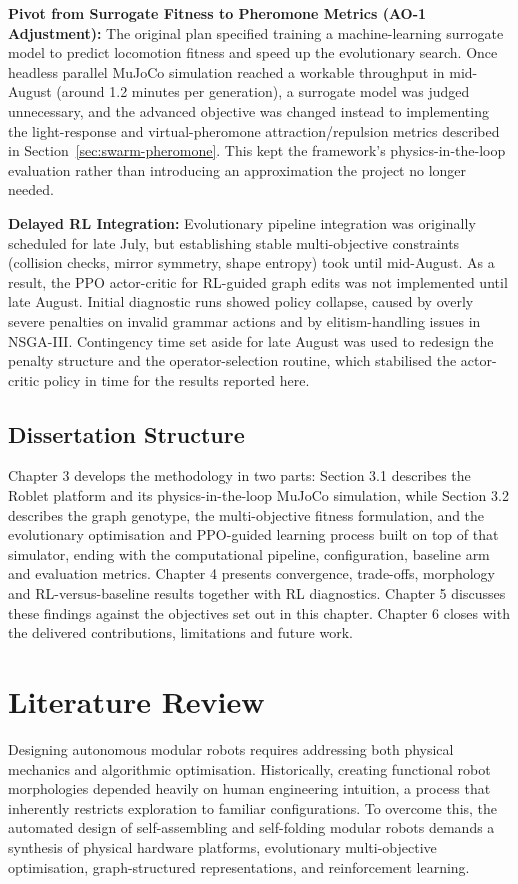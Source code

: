 \documentclass[12pt,a4paper]{report}
\begin{document}
\textbf{Pivot from Surrogate Fitness to Pheromone Metrics (AO-1 Adjustment):}
The original plan specified training a machine-learning surrogate model to predict locomotion fitness and speed up the evolutionary search. Once headless parallel MuJoCo simulation reached a workable throughput in mid-August (around 1.2 minutes per generation), a surrogate model was judged unnecessary, and the advanced objective was changed instead to implementing the light-response and virtual-pheromone attraction/repulsion metrics described in Section~\ref{sec:swarm-pheromone}. This kept the framework's physics-in-the-loop evaluation rather than introducing an approximation the project no longer needed.

\textbf{Delayed RL Integration:}
Evolutionary pipeline integration was originally scheduled for late July, but establishing stable multi-objective constraints (collision checks, mirror symmetry, shape entropy) took until mid-August. As a result, the PPO actor-critic for RL-guided graph edits was not implemented until late August. Initial diagnostic runs showed policy collapse, caused by overly severe penalties on invalid grammar actions and by elitism-handling issues in NSGA-III. Contingency time set aside for late August was used to redesign the penalty structure and the operator-selection routine, which stabilised the actor-critic policy in time for the results reported here.

\section{Dissertation Structure}
Chapter 3 develops the methodology in two parts: Section 3.1 describes the Roblet platform and its physics-in-the-loop MuJoCo simulation, while Section 3.2 describes the graph genotype, the multi-objective fitness formulation, and the evolutionary optimisation and PPO-guided learning process built on top of that simulator, ending with the computational pipeline, configuration, baseline arm and evaluation metrics. Chapter 4 presents convergence, trade-offs, morphology and RL-versus-baseline results together with RL diagnostics. Chapter 5 discusses these findings against the objectives set out in this chapter. Chapter 6 closes with the delivered contributions, limitations and future work.


\chapter{Literature Review}
Designing autonomous modular robots requires addressing both physical mechanics and algorithmic optimisation. Historically, creating functional robot morphologies depended heavily on human engineering intuition, a process that inherently restricts exploration to familiar configurations. To overcome this, the automated design of self-assembling and self-folding modular robots demands a synthesis of physical hardware platforms, evolutionary multi-objective optimisation, graph-structured representations, and reinforcement learning.
\end{document}
